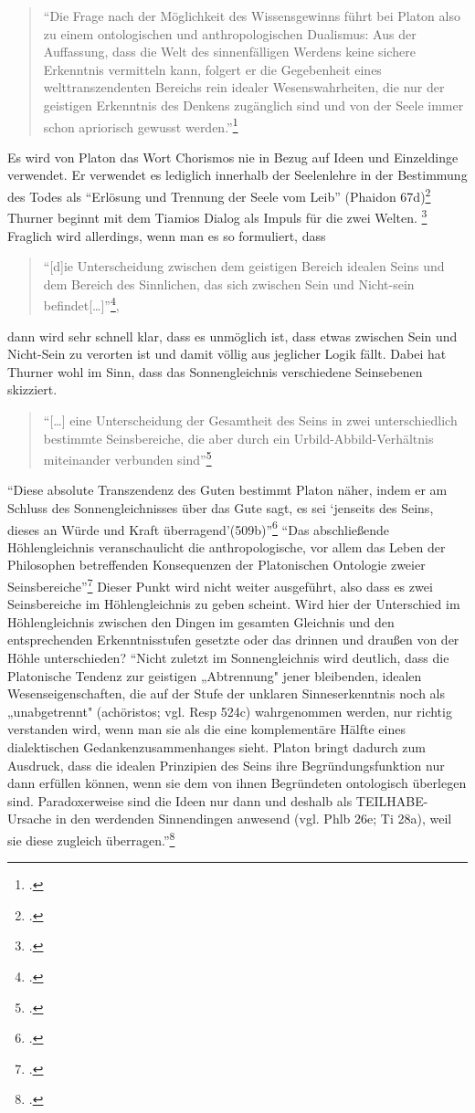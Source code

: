 \documentclass[12pt]{article}
\newcommand*{\zitatblock}[1]{%
    \begin{quote}
    \fontsize{10}{12}\selectfont
    \setlength{\parskip}{1.0em}
    #1
    \end{quote}
}
\begin{document}
\zitatblock{\enquote{Die Frage nach der Möglichkeit des Wissensgewinns führt bei Platon also zu einem ontologischen und anthropologischen Dualismus: Aus der Auffassung, dass die Welt des sinnenfälligen Werdens keine sichere Erkenntnis vermitteln kann, folgert er die Gegebenheit eines welttranszendenten Bereichs rein idealer Wesenswahrheiten, die nur der geistigen Erkenntnis des Denkens zugänglich sind und von der Seele immer schon apriorisch gewusst werden.}\footcite[][S. 99]{ThurnerDualismus}}
Es wird von Platon das Wort Chorismos nie in Bezug auf Ideen und Einzeldinge verwendet. Er verwendet es lediglich innerhalb der Seelenlehre in der Bestimmung des Todes als \enquote{Erlösung und Trennung der Seele vom Leib} (Phaidon 67d)\footcite[vgl.][S. 282]{ThurnerTrennung} 
Thurner beginnt mit dem Tiamios Dialog als Impuls für die zwei Welten. \footcite[vgl.][S. 283]{ThurnerTrennung} Fraglich wird allerdings, wenn man es so formuliert, dass \zitatblock{\enquote{[d]ie Unterscheidung zwischen dem geistigen Bereich idealen Seins und dem Bereich des Sinnlichen, das sich zwischen Sein und Nicht-sein befindet[\dots]}\footcite[vgl.][S. 283]{ThurnerTrennung},} dann wird sehr schnell klar, dass es unmöglich ist, dass etwas zwischen Sein und Nicht-Sein zu verorten ist und damit völlig aus jeglicher Logik fällt. Dabei hat Thurner wohl im Sinn, dass das Sonnengleichnis verschiedene Seinsebenen skizziert. \zitatblock{\enquote{[\dots] eine Unterscheidung der Gesamtheit des Seins in zwei unterschiedlich bestimmte Seinsbereiche, die aber durch ein Urbild-Abbild-Verhältnis miteinander verbunden sind}\footcite[vgl.][S. 284]{ThurnerTrennung}}
\enquote{Diese absolute Transzendenz des Guten bestimmt Platon näher, indem er am Schluss des Sonnengleichnisses über das Gute sagt, es sei \enquote{jenseits des Seins, dieses an Würde und Kraft überragend}(509b)}\footcite[][S. 284]{ThurnerTrennung}
\enquote{Das abschließende Höhlengleichnis veranschaulicht die anthropologische, vor allem das Leben der Philosophen betreffenden Konsequenzen der Platonischen Ontologie zweier Seinsbereiche}\footcite[][S. 284]{ThurnerTrennung} Dieser Punkt wird nicht weiter ausgeführt, also dass es zwei Seinsbereiche im Höhlengleichnis zu geben scheint. Wird hier der Unterschied im Höhlengleichnis zwischen den Dingen im gesamten Gleichnis und den entsprechenden Erkenntnisstufen gesetzte oder das drinnen und draußen von der Höhle unterschieden?
\enquote{Nicht zuletzt im Sonnengleichnis wird deutlich, dass die Platonische Tendenz zur geistigen „Abtrennung" jener bleibenden, idealen Wesenseigenschaften, die auf der Stufe der unklaren Sinneserkenntnis noch als „unabgetrennt" (achöristos; vgl. Resp 524c) wahrgenommen werden, nur richtig verstanden wird, wenn man sie als die eine komplementäre Hälfte eines dialektischen Gedankenzusammenhanges sieht. Platon bringt dadurch zum Ausdruck, dass die idealen Prinzipien des Seins ihre Begründungsfunktion nur dann erfüllen können, wenn sie dem von ihnen Begründeten ontologisch überlegen sind. Paradoxerweise sind die Ideen nur dann und deshalb als TEILHABE-Ursache in den werdenden Sinnendingen anwesend (vgl. Phlb 26e; Ti 28a), weil sie diese zugleich überragen.}\footcite[][S. 284f.]{ThurnerTrennung} 
\end{document}

